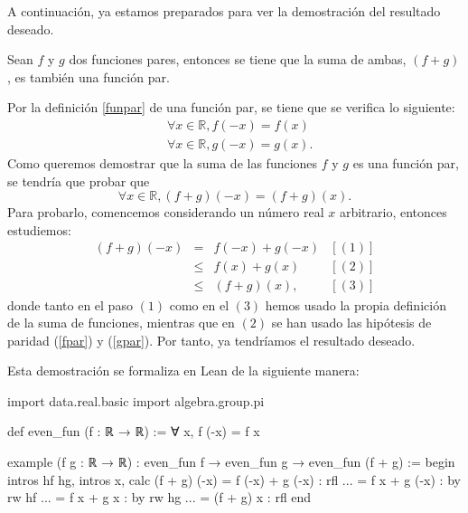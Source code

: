 A continuación, ya estamos preparados para ver la demostración del
resultado deseado.

\begin{teorema}
  Sean \(f\) y \(g\) dos funciones pares, entonces
  se tiene que la suma de ambas, \((f+g)\), es también una función par.
\end{teorema}

\begin{demostracion}
  Por la definición \ref{funpar} de una función par, se tiene que se
  verifica lo siguiente:
  \begin{align}
    & ∀ x ∈ ℝ, f(-x)=f(x)  \label{fpar} \\
    & ∀ x ∈ ℝ, g(-x)=g(x). \label{gpar}
  \end{align}
  Como queremos demostrar que la suma de las funciones \(f\) y \(g\) es
  una función par, se tendría que probar que
  \begin{equation}
    ∀ x ∈ ℝ, (f+g)(-x) = (f+g)(x).
  \end{equation}
  Para probarlo, comencemos considerando un número real \(x\) arbitrario,
  entonces estudiemos:
  \[\begin{array}{llll}
      (f+g)(-x) &= &f(-x)+g(-x) & [(1)]\\
                &≤ &f(x)+g(x)   & [(2)] \\
                &≤ &(f+g)(x),   & [(3)]
    \end{array}\]
  donde tanto en el paso \((1)\) como en el \((3)\) hemos usado la
  propia definición de la suma de funciones, mientras que en \((2) \) se
  han usado las hipótesis de paridad (\ref{fpar}) y (\ref{gpar}). Por
  tanto, ya tendríamos el resultado deseado.
\end{demostracion}

Esta demostración se formaliza en Lean de la siguiente manera:
\begin{leancode}
import data.real.basic
import algebra.group.pi

def even_fun (f : ℝ → ℝ) := ∀ x, f (-x) = f x

example
  (f g : ℝ → ℝ)
  : even_fun f → even_fun g →  even_fun (f + g) :=
begin
  intros hf hg,
  intros x,
  calc (f + g) (-x)
      = f (-x) + g (-x) : rfl
  ... = f x + g (-x)    : by rw hf
  ... = f x + g x       : by rw hg
  ... = (f + g) x       : rfl
end
\end{leancode}


